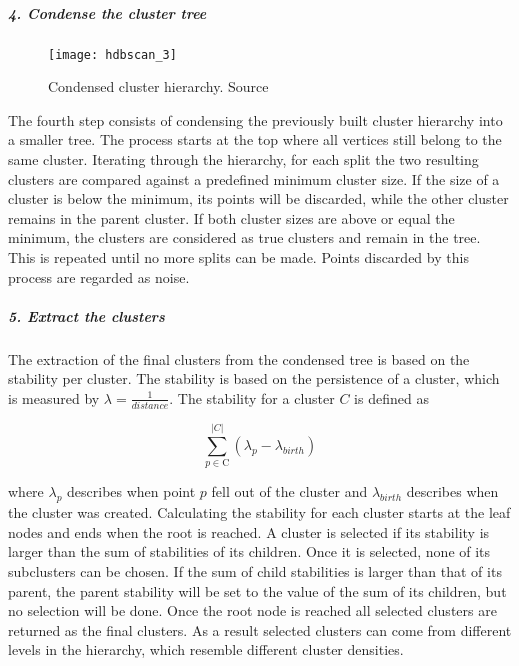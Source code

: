 \subparagraph{4. Condense the cluster tree}
\begin{figure}[h]
    \centering
    \texttt{[image: hdbscan\_3]}
    \caption{
        Condensed cluster hierarchy.
        Source\cite{how_hdbscan_works}
    }
    \label{fig:hdbscan_3}
\end{figure}

The fourth step consists of condensing the previously built cluster hierarchy into a smaller tree.
The process starts at the top where all vertices still belong to the same cluster.
Iterating through the hierarchy,
for each split the two resulting clusters are compared against a predefined minimum cluster size.
If the size of a cluster is below the minimum,
its points will be discarded, while the other cluster remains in the parent cluster.
If both cluster sizes are above or equal the minimum, the clusters are considered as true clusters and remain in the tree.
This is repeated until no more splits can be made.
Points discarded by this process are regarded as noise.

\subparagraph{5. Extract the clusters}
The extraction of the final clusters from the condensed tree is based on the stability per cluster.
The stability is based on the persistence of a cluster, which is measured by $\lambda = \frac{1}{distance}$.
The stability for a cluster $C$ is defined as

\begin{equation}
\sum_{p \in \text{C}}^{|C|} ({\lambda}_{p} - {\lambda}_{birth})
\end{equation}

where ${\lambda}_{p}$ describes when point $p$ fell out of the cluster and $ {\lambda}_{birth}$
describes when the cluster was created.
Calculating the stability for each cluster starts at the leaf nodes and ends when the root is reached.
A cluster is selected if its stability is larger than the sum of stabilities of its children.
Once it is selected, none of its subclusters can be chosen.
If the sum of child stabilities is larger than that of its parent,
the parent stability will be set to the value of the sum of its children,
but no selection will be done.
Once the root node is reached all selected clusters are returned as the final clusters.
As a result selected clusters can come from different levels in the hierarchy, 
which resemble different cluster densities.
